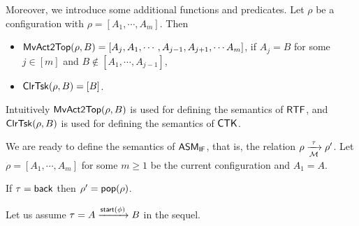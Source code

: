 Moreover, we introduce some additional functions and predicates. 
Let $\rho$ be a configuration with $\rho = [A_1,\cdots,A_m]$. Then
\begin{itemize}
	\item $\mathsf{MvAct2Top}(\rho, B) = [A_j,A_1,\cdots,A_{j-1},A_{j+1},\cdots A_m]$, if $A_j = B$ for some $j\in[m]$ and $B\notin[A_1,\cdots,A_{j-1}]$,
	\item $\mathsf{ClrTsk}(\rho, B) = [B]$.
\end{itemize}
Intuitively $\mathsf{MvAct2Top}(\rho, B)$ is used for defining the semantics of ${\sf RTF}$, and $\mathsf{ClrTsk}(\rho, B)$ is used for defining the semantics of ${\sf CTK}$.

We are ready to define the semantics of $\textsf{ASM}_\textsf{IF}$, that is, the relation $\rho \xrightarrow[{\mathcal{M} }]{\tau} \rho'$.
Let $\rho = [A_1,\cdots,A_m]$ for some $m\ge 1$ be the current configuration and $A_1 = A$. 

If $\tau = {\mathsf{back} }$ then $\rho' = \mathsf{pop}(\rho)$.

Let us assume  $\tau = A\xrightarrow[]{{\mathsf{start} }(\phi)}B$ in the sequel.

